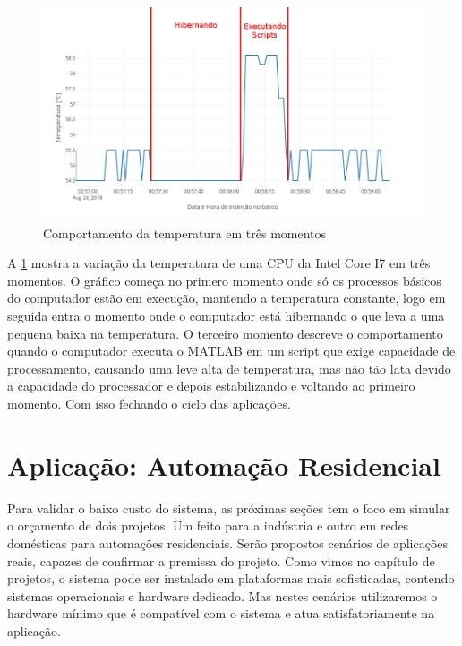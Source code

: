 \begin{figure}[h!]
\centering
\includegraphics[width=16cm]{./02_Capitulos/02_Cap4/figures/cpu-temp_1}
\caption{Comportamento da temperatura em três momentos}
\label{fig:4.1.0/cpu-temp_1}
\end{figure}

A \ref{fig:4.1.0/cpu-temp_1} mostra a variação da temperatura de uma CPU da Intel Core I7 em três momentos. O gráfico começa no primero momento onde só os processos básicos do computador estão em execução, mantendo a temperatura constante, logo em seguida entra o momento onde o computador está hibernando o que leva a uma pequena baixa na temperatura. O terceiro momento descreve o comportamento quando o computador executa o MATLAB em um script que exige capacidade de processamento, causando uma leve alta de temperatura, mas não tão lata devido a capacidade do processador e depois estabilizando e voltando ao primeiro momento. Com isso fechando o ciclo das aplicações.



\section{Aplicação: Automação Residencial}
\label{section:residencial}

Para validar o baixo custo do sistema, as próximas seções tem o foco em simular o orçamento de dois projetos. Um feito para a indústria e outro em redes domésticas para automações residenciais. Serão propostos cenários de aplicações reais, capazes de confirmar a premissa do projeto.
Como vimos no capítulo de projetos, o sistema pode ser instalado em plataformas mais sofisticadas, contendo sistemas operacionais e hardware dedicado. Mas nestes cenários utilizaremos o hardware mínimo que é compatível com o sistema e atua satisfatoriamente na aplicação.


